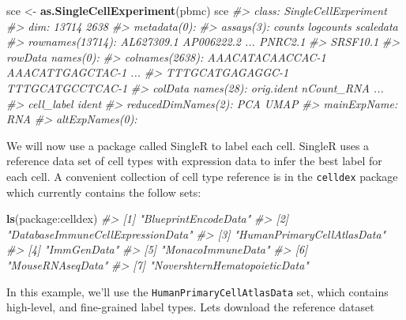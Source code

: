 \documentclass[
]{book}
\newenvironment{Shaded}{\begin{snugshade}}{\end{snugshade}}
\newcommand{\CommentTok}[1]{\textcolor[rgb]{0.56,0.35,0.01}{\textit{#1}}}
\newcommand{\FunctionTok}[1]{\textcolor[rgb]{0.13,0.29,0.53}{\textbf{#1}}}
\newcommand{\NormalTok}[1]{#1}
\newcommand{\OtherTok}[1]{\textcolor[rgb]{0.56,0.35,0.01}{#1}}
\newcommand{\StringTok}[1]{\textcolor[rgb]{0.31,0.60,0.02}{#1}}
\begin{document}
\begin{Shaded}
\begin{Highlighting}[]
\NormalTok{sce }\OtherTok{\textless{}{-}} \FunctionTok{as.SingleCellExperiment}\NormalTok{(pbmc)}
\NormalTok{sce}
\CommentTok{\#\textgreater{} class: SingleCellExperiment }
\CommentTok{\#\textgreater{} dim: 13714 2638 }
\CommentTok{\#\textgreater{} metadata(0):}
\CommentTok{\#\textgreater{} assays(3): counts logcounts scaledata}
\CommentTok{\#\textgreater{} rownames(13714): AL627309.1 AP006222.2 ... PNRC2.1}
\CommentTok{\#\textgreater{}   SRSF10.1}
\CommentTok{\#\textgreater{} rowData names(0):}
\CommentTok{\#\textgreater{} colnames(2638): AAACATACAACCAC{-}1 AAACATTGAGCTAC{-}1 ...}
\CommentTok{\#\textgreater{}   TTTGCATGAGAGGC{-}1 TTTGCATGCCTCAC{-}1}
\CommentTok{\#\textgreater{} colData names(28): orig.ident nCount\_RNA ...}
\CommentTok{\#\textgreater{}   cell\_label ident}
\CommentTok{\#\textgreater{} reducedDimNames(2): PCA UMAP}
\CommentTok{\#\textgreater{} mainExpName: RNA}
\CommentTok{\#\textgreater{} altExpNames(0):}
\end{Highlighting}
\end{Shaded}

We will now use a package called SingleR to label each cell. SingleR uses a reference data set of cell types with expression data to infer the best label for each cell. A convenient collection of cell type reference is in the \texttt{celldex} package which currently contains the follow sets:

\begin{Shaded}
\begin{Highlighting}[]
\FunctionTok{ls}\NormalTok{(}\StringTok{\textquotesingle{}package:celldex\textquotesingle{}}\NormalTok{)}
\CommentTok{\#\textgreater{} [1] "BlueprintEncodeData"             }
\CommentTok{\#\textgreater{} [2] "DatabaseImmuneCellExpressionData"}
\CommentTok{\#\textgreater{} [3] "HumanPrimaryCellAtlasData"       }
\CommentTok{\#\textgreater{} [4] "ImmGenData"                      }
\CommentTok{\#\textgreater{} [5] "MonacoImmuneData"                }
\CommentTok{\#\textgreater{} [6] "MouseRNAseqData"                 }
\CommentTok{\#\textgreater{} [7] "NovershternHematopoieticData"}
\end{Highlighting}
\end{Shaded}

In this example, we'll use the \texttt{HumanPrimaryCellAtlasData} set, which contains high-level, and fine-grained label types. Lets download the reference dataset
\end{document}
